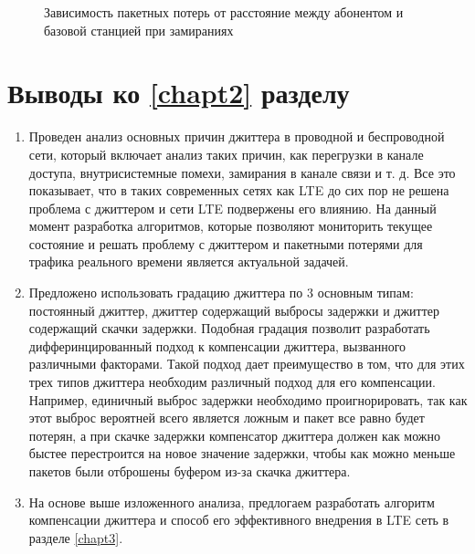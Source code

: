 \pgfplotsset{width=15cm, height=7cm, compat=1.3}
\begin{figure} [!h]
  \center
{}
\caption{Зависимость пакетных потерь от расстояние между абонентом и базовой станцией при замираниях}
  \label{img2:fad_drop}
\end{figure}

\clearpage


\section{Выводы ко \ref{chapt2} разделу} \label{sect:concl2}

\begin{enumerate}
\item Проведен анализ основных причин джиттера в проводной и беспроводной сети, который включает анализ таких причин, как перегрузки в канале доступа, внутрисистемные помехи, замирания в канале связи и т. д. Все это показывает, что в таких современных сетях как LTE до сих пор не решена проблема с джиттером и сети LTE подвержены его влиянию. На данный момент разработка алгоритмов, которые позволяют мониторить текущее состояние и решать проблему с джиттером и пакетными потерями для трафика реального времени является актуальной задачей.
\item Предложено использовать градацию джиттера по 3 основным типам: постоянный джиттер, джиттер содержащий выбросы задержки и джиттер содержащий скачки задержки.
Подобная градация позволит разработать дифферинцированный подход к компенсации джиттера, вызванного различными факторами. Такой подход дает преимущество в том, что для этих трех типов джиттера необходим различный подход для его компенсации. Например, единичный выброс задержки необходимо проигнорировать, так как этот выброс вероятней всего является ложным и пакет все равно будет потерян, а при скачке задержки компенсатор джиттера должен как можно быстее перестроится на новое значение задержки, чтобы как можно меньше пакетов были отброшены буфером из-за скачка джиттера.
\item На основе выше изложенного анализа, предлогаем разработать алгоритм компенсации джиттера и способ его эффективного внедрения в LTE сеть в разделе \ref{chapt3}.
\end{enumerate}


